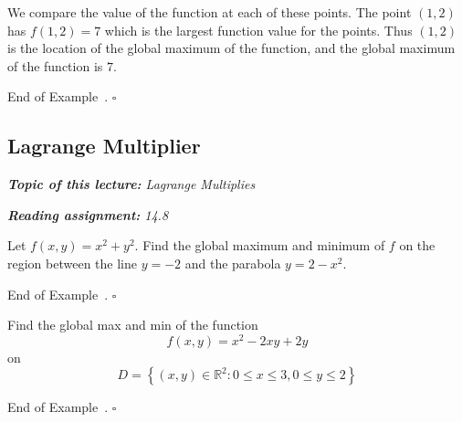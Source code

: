 \documentclass[10pt]{article}
\theoremstyle{definition}
\newtheorem{example}[theorem]{Example}
\renewenvironment{example}
{\begin{oldexample}}
  {\par\smallskip\hfill   End of Example~\theexample. $\square$    \par\end{oldexample}}
\newcommand{\1}[1]{\textbf{1}_{\left[#1\right]}} %
\def\R{\mathbb{R}} %
\begin{document}
\begin{example}
\begin{center}
  \end{center}

  We compare the value of the function at each of these points. The point
  $(1,2)$ has $f(1,2)=7$ which is the largest function value for the points.
  Thus $(1,2)$ is the location of the global maximum of the function, and the global maximum of the
  function is $7$. 
\end{example}


\newpage

\subsection{Lagrange Multiplier}
\begin{center}
  \begin{tcolorbox}[width=0.9\textwidth, colback=white, colframe=black]
    \textit{\textbf{Topic of this lecture:} Lagrange Multiplies}

    \textit{\textbf{Reading assignment:} 14.8}
  \end{tcolorbox}
\end{center}

\begin{example}
  Let $f(x,y) = x^{2}+y^{2}$. Find the global maximum and minimum of $f$ on
  the region between the line $y=-2$ and the parabola $ y=2-x^{2}$.
\end{example}

\begin{example}
  Find the global max and min of the function
  \begin{equation*}
    f(x,y) =x^{2}-2xy+2y
  \end{equation*}
  on
  \begin{equation*}
    D = \left\{(x,y)\in \R^{2}: 0 \leq x \leq 3, 0 \leq y \leq 2\right\}
  \end{equation*}
\end{example}
\end{document}
